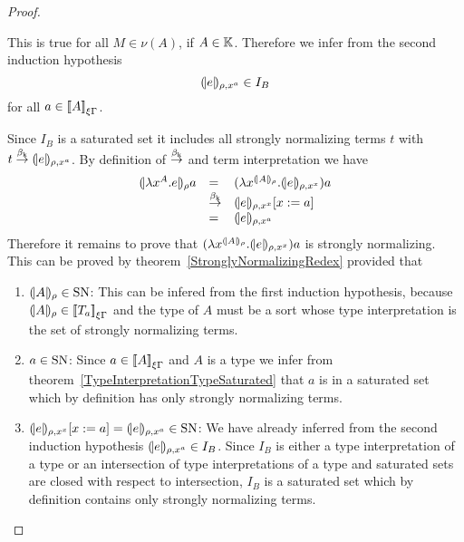 \begin{theorem}
\begin{proof}
\begin{enumerate}
            This is true for all $M \in \nu(A)$, if $A \in \mathbb{K}$. Therefore we
            infer from the second induction hypothesis
            $$
            {(\!|e|\!)_{\rho,x^a}} \in I_B
            $$
            for all $a \in {{[\![}A{]\!]}}_{\xi\Gamma}$.

            Since $I_B$ is a saturated set it includes all strongly normalizing
            terms $t$ with $t \stackrel{\beta_{\text{k}}}{\to} {(\!|e|\!)_{\rho,x^a}}$. By definition
            of $\stackrel{\beta_{\text{k}}}{\to}$ and term interpretation we have
            $$
            \begin{array}{lll}
                \terminter{\lambda x^A. e}{\rho} a
                &=&
                (\lambda x^{\terminter{A}{\rho}}. \terminter{e}{\rho,x^x}) a
                \\
                &\keyreduce&
                \terminter{e}{\rho,x^x} [x:=a]
                \\
                &=&
                \terminter{e}{\rho,x^a}
            \end{array}
            $$
            Therefore it remains to prove that $(\lambda
            x^{{(\!|A|\!)_{\rho}}}. {(\!|e|\!)_{\rho,x^x}}) a$ is strongly
            normalizing. This can be proved by
            theorem~\ref{StronglyNormalizingRedex} provided that
            \begin{enumerate}
            \item ${(\!|A|\!)_{\rho}} \in \text{SN}$: This can be infered from the
                first induction hypothesis, because ${(\!|A|\!)_{\rho}} \in
                {{[\![}T_a{]\!]}}_{\xi\Gamma}$ and the type of $A$ must be a
                sort whose type interpretation is the set of strongly
                normalizing terms.

            \item $a \in \text{SN}$: Since $a \in {{[\![}A{]\!]}}_{\xi\Gamma}$ and $A$ is
                a type we infer from
                theorem~\ref{TypeInterpretationTypeSaturated} that $a$ is in
                a saturated set which by definition has only strongly
                normalizing terms.

            \item
                ${(\!|e|\!)_{\rho,x^x}}[x:=a]
                = {(\!|e|\!)_{\rho,x^a}}
                \in \text{SN}$:
                We have already inferred from the second induction
                hypothesis ${(\!|e|\!)_{\rho,x^a}} \in I_B$. Since $I_B$
                is either a type interpretation of a type or an intersection
                of type interpretations of a type and saturated sets are
                closed with respect to intersection, $I_B$ is a saturated
                set which by definition contains only strongly normalizing
                terms.


\end{enumerate}
\end{enumerate}
\end{proof}
\end{theorem}
